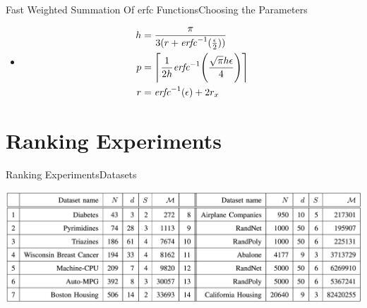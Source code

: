 \documentclass[8pt]{beamer}
\makeatletter
\renewcommand{\|}[1][.3em]{\hspace{#1}|\hspace{#1}}
\renewcommand{\,}[1][.3em]{,\hspace{#1}}
\DeclarePairedDelimiter\abs{\lvert}{\rvert}%
\let\oldabs\abs
\def\abs{\@ifstar{\oldabs}{\oldabs*}}
\newlength{\wideitemsep}
\let\olditem\item
\renewcommand{\item}{\setlength{\itemsep}{\wideitemsep}\olditem}
\DeclarePairedDelimiter{\ceil}{\lceil}{\rceil}
\newcommand{\m}[1]{\mathcal{#1}}
\renewcommand{\,}{,\hspace{3pt}}
\renewcommand{\|}{\hspace{3pt}|\hspace{3pt}}
\newcommand{\erfc}{{\text{\textit{erfc}}}}
\renewcommand{\O}{\m{O}}
\makeatother
\begin{document}

\begin{frame}{Fast Weighted Summation Of erfc Functions}{Choosing the Parameters}
    \begin{itemize}
    \item[] \begin{align}
    h &= {\pi \over 3(r + \erfc^{-1}({\epsilon \over 2}))}\\
    p &= \ceil[\Bigg]{{1 \over 2h}\erfc^{-1}\Bigg({\sqrt{\pi}h\epsilon \over 4}\Bigg)}\\
    r &= \erfc^{-1}(\epsilon) + 2r_x
    \end{align}
    \end{itemize}
\end{frame}

\section{Ranking Experiments}
\begin{frame}{Ranking Experiments}{Datasets}
    \begin{table}
    \centering
    \includegraphics[width=\textwidth]{datasets}
    \caption{$N$ is the size of the data set. $d$ is the number of attributes. $S$ is the number of classes. $M$ is the average total number of pairwise relations per fold of the training set.}\label{tab:res_db}
    \end{table}
\end{frame}
\end{document}
